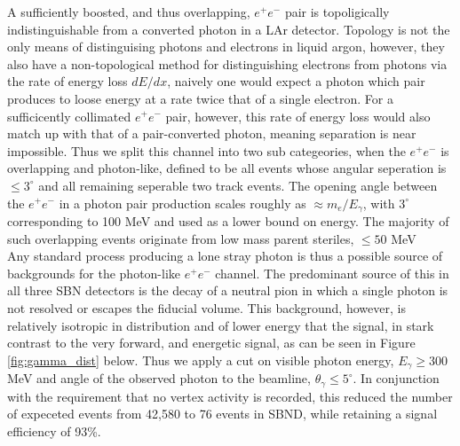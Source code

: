 \documentclass[11pt, a4paper]{article}
\begin{document}
A sufficiently boosted, and thus overlapping, $e^+e^-$ pair is topoligically indistinguishable from a converted photon in a LAr detector. Topology is not the only means of distinguising photons and electrons in liquid argon, however, they also have a non-topological method for distinguishing electrons from photons via the rate of energy loss $dE/dx$, naively one would expect a photon which pair produces to loose energy at a rate twice that of a single electron. For a sufficicently collimated $e^+e^-$ pair, however, this rate of energy loss would also match up with that of a pair-converted photon, meaning separation is near impossible. Thus we split this channel into two sub categeories, when the $e^+e^-$ is overlapping and photon-like, defined to be all events whose angular seperation is $\leq 3^\circ$\cite{Spitz:2011wba} and all remaining seperable two track events. The opening angle between the $e^+e^-$ in a photon pair production scales roughly as $\approx m_e/E_\gamma$, with $3^\circ$ corresponding to 100 MeV and used as a lower bound on energy. The majority of such overlapping events originate from low mass parent steriles, $\leq 50$ MeV\\ 

Any standard process producing a lone stray photon is thus a possible source of backgrounds for the photon-like $e^+e^-$ channel. The predominant source of this in all three SBN detectors is the decay of a neutral pion in which a single photon is not resolved or escapes the fiducial volume. This background, however, is relatively isotropic in distribution and of lower energy that the signal, in stark contrast to the very forward, and energetic signal, as can be seen in Figure \ref{fig:gamma_dist} below. Thus we apply a cut on visible photon energy, $E_\gamma \geq 300 $ MeV and angle of the observed photon to the beamline, $\theta_\gamma \leq 5^\circ$. In conjunction with the requirement that no vertex activity is recorded, this reduced the number of expeceted events from 42,580 to 76 events in SBND, while retaining a signal efficiency of 93\%.
\end{document}
